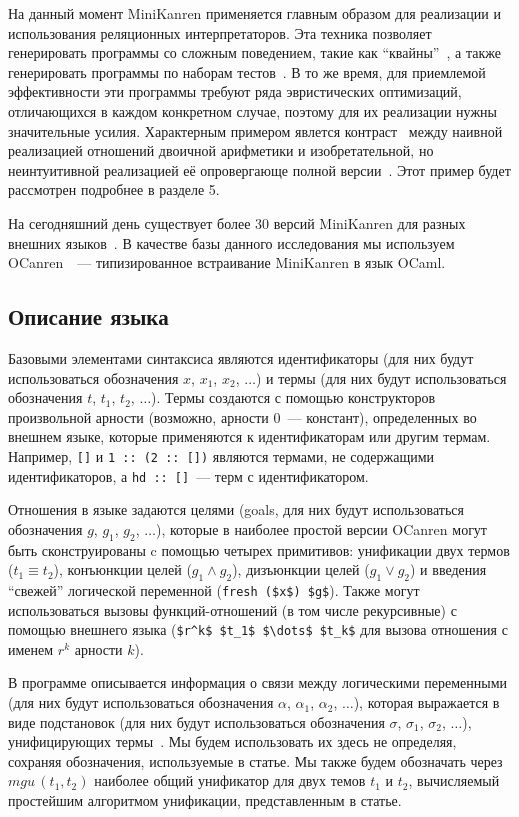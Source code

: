     На данный момент MiniKanren применяется главным образом для реализации и использования реляционных интерпретаторов. Эта техника позволяет генерировать программы со сложным поведением, такие как ``квайны''~\cite{Untagged}, а также генерировать программы по наборам тестов~\cite{unified}. В то же время, для приемлемой эффективности эти программы требуют ряда эвристических оптимизаций, отличающихся в каждом конкретном случае, поэтому для их реализации нужны значительные усилия. Характерным примером явлется контраст~\cite{WillThesis} между наивной реализацией отношений двоичной арифметики и изобретательной, но неинтуитивной реализацией её опровергающе полной версии~\cite{KiselyovArithmetic}. Этот пример будет рассмотрен подробнее в разделе 5.

    На сегодняшний день существует более 30 версий MiniKanren для разных внешних языков~\cite{MiniKanrenOrg}. В качестве базы данного исследования мы используем OCanren~\cite{ocanren}~--- типизированное встраивание MiniKanren в язык OCaml.
    
  \subsection{Описание языка}
    
    Базовыми элементами синтаксиса являются идентификаторы (для них будут использоваться обозначения $x$, $x_1$, $x_2$, $\dots$) и термы (для них будут использоваться обозначения $t$, $t_1$, $t_2$, $\dots$). Термы создаются с помощью конструкторов произвольной арности (возможно, арности 0~--- констант), определенных во внешнем языке, которые применяются к идентификаторам или другим термам. Например, \lstinline|[]| и \lstinline|1 :: (2 :: [])| являются термами, не содержащими идентификаторов, а \lstinline|hd :: []|~--- терм с идентификатором.
    
    Отношения в языке задаются целями (goals, для них будут использоваться обозначения $g$, $g_1$, $g_2$, $\dots$), которые в наиболее простой версии OCanren могут быть сконструированы c помощью четырех примитивов: унификации двух термов (\mbox{$t_1 \equiv t_2$}), конъюнкции целей (\mbox{$g_1 \wedge g_2$}), дизъюнкции целей (\mbox{$g_1 \vee g_2$}) и введения ``свежей'' логической переменной (\lstinline|fresh ($x$) $g$|). Также могут использоваться вызовы функций-отношений (в том числе рекурсивные) с помощью внешнего языка (\lstinline|$r^k$ $t_1$ $\dots$ $t_k$| для вызова отношения с именем $r^k$ арности $k$).
    
    В программе описывается информация о связи между логическими переменными (для них будут использоваться обозначения $\alpha$, $\alpha_1$, $\alpha_2$, $\dots$), которая выражается в виде подстановок (для них будут использоваться обозначения $\sigma$, $\sigma_1$, $\sigma_2$, $\dots$), унифицирующих термы~\cite{Unification}. Мы будем использовать их здесь не определяя, сохраняя обозначения, используемые в статье. Мы также будем обозначать через $mgu\,(t_1, t_2)$ наиболее общий унификатор для двух темов $t_1$ и $t_2$, вычисляемый простейшим алгоритмом унификации, представленным в статье.
    
